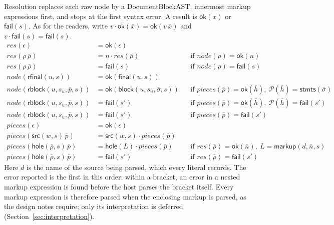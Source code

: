\documentclass[11pt]{article}
\numberwithin{equation}{section}
\newcommand{\kw}[1]{\ensuremath{\mathsf{#1}}}
\begin{document}
Resolution replaces each raw node by a DocumentBlockAST, innermost markup
expressions first, and stops at the first syntax error.  A result is
$\kw{ok}(x)$ or $\kw{fail}(s)$.  As for the readers, write
$v \cdot \kw{ok}(\bar x) = \kw{ok}(v\,\bar x)$ and
$v \cdot \kw{fail}(s) = \kw{fail}(s)$.
\begin{equation}\label{eq:resolve}
\begin{aligned}
\mathit{res}(\epsilon) &= \kw{ok}(\epsilon) \\
\mathit{res}(\rho\,\bar\rho) &= n \cdot \mathit{res}(\bar\rho)
  && \text{if } \mathit{node}(\rho) = \kw{ok}(n) \\
\mathit{res}(\rho\,\bar\rho) &= \kw{fail}(s)
  && \text{if } \mathit{node}(\rho) = \kw{fail}(s) \\[1ex]
\mathit{node}(\kw{rfinal}(u, s)) &= \kw{ok}(\kw{final}(u, s)) \\
\mathit{node}(\kw{rblock}(u, s_u, \bar p, s)) &=
  \kw{ok}(\kw{block}(u, s_u, \bar\sigma, s))
  && \text{if } \mathit{pieces}(\bar p) = \kw{ok}(\bar h),\
     \mathcal{P}(\bar h) = \kw{stmts}(\bar\sigma) \\
\mathit{node}(\kw{rblock}(u, s_u, \bar p, s)) &= \kw{fail}(s')
  && \text{if } \mathit{pieces}(\bar p) = \kw{ok}(\bar h),\
     \mathcal{P}(\bar h) = \kw{fail}(s') \\
\mathit{node}(\kw{rblock}(u, s_u, \bar p, s)) &= \kw{fail}(s')
  && \text{if } \mathit{pieces}(\bar p) = \kw{fail}(s') \\[1ex]
\mathit{pieces}(\epsilon) &= \kw{ok}(\epsilon) \\
\mathit{pieces}(\kw{src}(w, s)\,\bar p) &=
  \kw{src}(w, s) \cdot \mathit{pieces}(\bar p) \\
\mathit{pieces}(\kw{hole}(\bar\rho, s)\,\bar p) &=
  \kw{hole}(L) \cdot \mathit{pieces}(\bar p)
  && \text{if } \mathit{res}(\bar\rho) = \kw{ok}(\bar n),\
     L = \kw{markup}(d, \bar n, s) \\
\mathit{pieces}(\kw{hole}(\bar\rho, s)\,\bar p) &= \kw{fail}(s')
  && \text{if } \mathit{res}(\bar\rho) = \kw{fail}(s')
\end{aligned}
\end{equation}
Here $d$ is the name of the source being parsed, which every literal records.
The error reported is the first in this order: within a bracket, an error
in a nested markup expression is found before the host parses the bracket
itself.  Every markup expression is therefore parsed when the enclosing
markup is parsed, as the design notes require; only its interpretation is
deferred (Section~\ref{sec:interpretation}).
\end{document}
